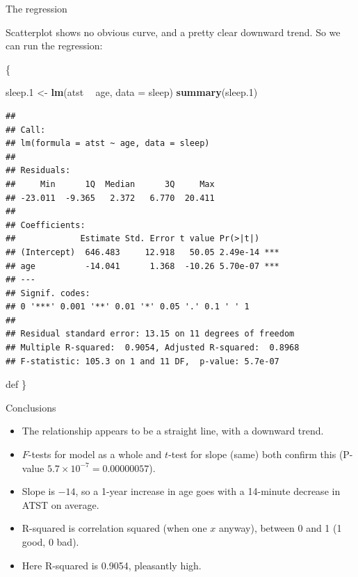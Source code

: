 \documentclass[ignorenonframetext,]{beamer}
\newenvironment{Shaded}{\begin{snugshade}}{\end{snugshade}}
\newcommand{\DataTypeTok}[1]{\textcolor[rgb]{0.13,0.29,0.53}{#1}}
\newcommand{\FloatTok}[1]{\textcolor[rgb]{0.00,0.00,0.81}{#1}}
\newcommand{\KeywordTok}[1]{\textcolor[rgb]{0.13,0.29,0.53}{\textbf{#1}}}
\newcommand{\NormalTok}[1]{#1}
\newcommand{\OperatorTok}[1]{\textcolor[rgb]{0.81,0.36,0.00}{\textbf{#1}}}
\newcommand{\StringTok}[1]{\textcolor[rgb]{0.31,0.60,0.02}{#1}}
\begin{document}
\begin{frame}[fragile]{The regression}
\protect\hypertarget{the-regression}{}

Scatterplot shows no obvious curve, and a pretty clear downward trend.
So we can run the regression:

\{\scriptsize

\begin{Shaded}
\begin{Highlighting}[]
\NormalTok{sleep}\FloatTok{.1}\NormalTok{ <-}\StringTok{ }\KeywordTok{lm}\NormalTok{(atst }\OperatorTok{~}\StringTok{ }\NormalTok{age, }\DataTypeTok{data =}\NormalTok{ sleep)}
\KeywordTok{summary}\NormalTok{(sleep}\FloatTok{.1}\NormalTok{)}
\end{Highlighting}
\end{Shaded}

\begin{verbatim}
## 
## Call:
## lm(formula = atst ~ age, data = sleep)
## 
## Residuals:
##     Min      1Q  Median      3Q     Max 
## -23.011  -9.365   2.372   6.770  20.411 
## 
## Coefficients:
##             Estimate Std. Error t value Pr(>|t|)    
## (Intercept)  646.483     12.918   50.05 2.49e-14 ***
## age          -14.041      1.368  -10.26 5.70e-07 ***
## ---
## Signif. codes:  
## 0 '***' 0.001 '**' 0.01 '*' 0.05 '.' 0.1 ' ' 1
## 
## Residual standard error: 13.15 on 11 degrees of freedom
## Multiple R-squared:  0.9054, Adjusted R-squared:  0.8968 
## F-statistic: 105.3 on 1 and 11 DF,  p-value: 5.7e-07
\end{verbatim}

def \}

\end{frame}

\begin{frame}{Conclusions}
\protect\hypertarget{conclusions}{}

\begin{itemize}
\item
  The relationship appears to be a straight line, with a downward trend.
\item
  \(F\)-tests for model as a whole and \(t\)-test for slope (same) both
  confirm this (P-value \(5.7\times 10^{-7}=0.00000057\)).
\item
  Slope is \(-14\), so a 1-year increase in age goes with a 14-minute
  decrease in ATST on average.
\item
  R-squared is correlation squared (when one \(x\) anyway), between 0
  and 1 (1 good, 0 bad).
\item
  Here R-squared is 0.9054, pleasantly high.
\end{itemize}

\end{frame}
\end{document}
